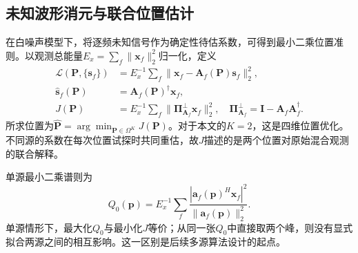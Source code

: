 \subsection{未知波形消元与联合位置估计}
在白噪声模型下，将逐频未知信号作为确定性待估系数，可得到最小二乘位置准则。以观测总能量$E_x=\sum_f\|\bm x_f\|_2^2$归一化，定义
\begin{align}
 \mathcal L(\bm P,\{\bm s_f\})
   &=E_x^{-1}\sum_f\|\bm x_f-\bm A_f(\bm P)\bm s_f\|_2^2,\label{eq:fullLS}\\
 \widehat{\bm s}_f(\bm P)&=\bm A_f(\bm P)^\dagger\bm x_f,\label{eq:waveLS}\\
 J(\bm P)&=E_x^{-1}\sum_f\|\bm\Pi_{\bm A_f}^{\perp}\bm x_f\|_2^2,
 \quad \bm\Pi_{\bm A_f}^{\perp}=\bm I-\bm A_f\bm A_f^\dagger .\label{eq:profile}
\end{align}
所求位置为$\widehat{\bm P}=\arg\min_{\bm P\in\Omega^K}J(\bm P)$。对于本文的$K=2$，这是四维位置优化。不同源的系数在每次位置试探时共同重估，故$J$描述的是两个位置对原始混合观测的联合解释。

单源最小二乘谱则为
\begin{equation}
 Q_0(\bm p)=E_x^{-1}\sum_f
 \frac{|\bm a_f(\bm p)^H\bm x_f|^2}{\|\bm a_f(\bm p)\|_2^2} .\label{eq:single}
\end{equation}
单源情形下，最大化$Q_0$与最小化$J$等价；从同一张$Q_0$中直接取两个峰，则没有显式拟合两源之间的相互影响。这一区别是后续多源算法设计的起点。
